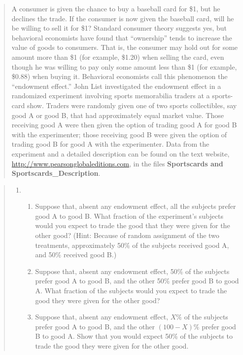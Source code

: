 \documentclass[
]{book}
\providecommand{\tightlist}{%
  \setlength{\itemsep}{0pt}\setlength{\parskip}{0pt}}
\begin{document}
\begin{quote}
A consumer is given the chance to buy a baseball card for \$1, but he declines
the trade. If the consumer is now given the baseball card, will he be willing to sell it for \$1? Standard consumer theory suggests yes, but behavioral economists have found that ``ownership'' tends to increase the value of goods to
consumers. That is, the consumer may hold out for some amount more than
\$1 (for example, \$1.20) when selling the card, even though he was willing
to pay only some amount less than \$1 (for example, \$0.88) when buying it.
Behavioral economists call this phenomenon the ``endowment effect.'' John
List investigated the endowment effect in a randomized experiment involving
sports memorabilia traders at a sports-card show. Traders were randomly
given one of two sports collectibles, say good A or good B, that had approximately equal market value. Those receiving good A were then given the
option of trading good A for good B with the experimenter; those receiving
good B were given the option of trading good B for good A with the
experimenter. Data from the experiment and a detailed description can be
found on the text website, \url{http://www.pearsonglobaleditions.com}, in the files \textbf{Sportscards and Sportscards\_Description}.
\end{quote}

\begin{quote}
\begin{enumerate}
\def\labelenumi{\alph{enumi}.}
\item
  \begin{enumerate}
  \def\labelenumii{\roman{enumii}.}
  \tightlist
  \item
    Suppose that, absent any endowment effect, all the subjects prefer good A to good B. What fraction of the experiment's subjects would you expect to trade the good that they were given for the other good? (Hint:
    Because of random assignment of the two treatments, approximately 50\% of the subjects received good A, and 50\% received good B.)
  \item
    Suppose that, absent any endowment effect, 50\% of the subjects prefer good A to good B, and the other 50\% prefer good B to good A. What fraction of the subjects would you expect to trade the good they were given for the other good?
  \item
    Suppose that, absent any endowment effect, \(X\%\) of the subjects prefer good A to good B, and the other \((100 - X)\%\) prefer good B to good A. Show that you would expect 50\% of the subjects to trade the good they were given for the other good.
  \end{enumerate}
\end{enumerate}
\end{quote}
\end{document}
